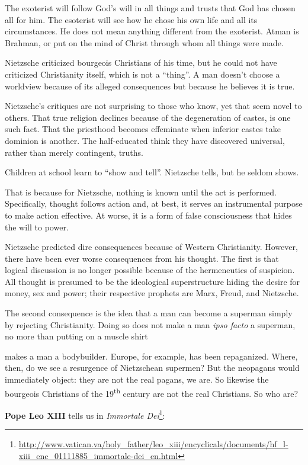 The exoterist will follow God's will in all things and trusts that God has chosen all for him. The esoterist will see how he chose his own life and all its circumstances. He does not mean anything different from the exoterist. Atman is Brahman, or put on the mind of Christ through whom all things were made.

Nietzsche criticized bourgeois Christians of his time, but he could not have criticized Christianity itself, which is not a ``thing''. A man doesn't choose a worldview because of its alleged consequences but because he believes it is true.

Nietzsche's critiques are not surprising to those who know, yet that seem novel to others. That true religion declines because of the degeneration of castes, is one such fact. That the priesthood becomes effeminate when inferior castes take dominion is another. The half-educated think they have discovered universal, rather than merely contingent, truths.

Children at school learn to ``show and tell''. Nietzsche tells, but he seldom shows.

That is because for Nietzsche, nothing is known until the act is performed. Specifically, thought follows action and, at best, it serves an instrumental purpose to make action effective. At worse, it is a form of false consciousness that hides the will to power.

Nietzsche predicted dire consequences because of Western Christianity. However, there have been ever worse consequences from his thought. The first is that logical discussion is no longer possible because of the hermeneutics of suspicion. All thought is presumed to be the ideological superstructure hiding the desire for money, sex and power; their respective prophets are Marx, Freud, and Nietzsche.

The second consequence is the idea that a man can become a superman simply by rejecting Christianity. Doing so does not make a man
\emph{ipso facto} a superman, no more than putting on a muscle shirt

makes a man a bodybuilder. Europe, for example, has been repaganized. Where, then, do we see a resurgence of Nietzschean supermen? But the neopagans would immediately object: they are not the real pagans, we are. So likewise the bourgeois Christians of the 19\textsuperscript{th} century are not the real Christians. So who are?

\textbf{Pope Leo XIII} tells us in \textit{Immortale Dei}\footnote{\url{http://www.vatican.va/holy_father/leo_xiii/encyclicals/documents/hf_l-xiii_enc_01111885_immortale-dei_en.html}}:

